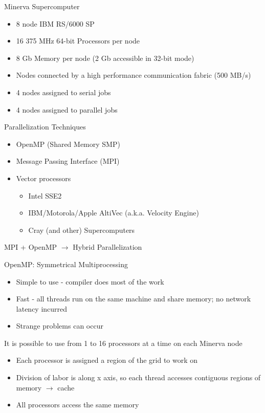 \documentclass[pdf, nototal, slideBW]{prosper}
\newcommand{\insgraphic}[2]{
  \begin{center}
    \scalebox{#1}{
      \texttt{[image: \#2]}
    }
  \end{center}
}
\begin{document}
\begin{slide}{Minerva Supercomputer}
  \insgraphic{0.5}{minerva-sp.eps}
  
  \begin{itemize}
  \item 8 node IBM RS/6000 SP 
  \item 16 375 MHz 64-bit Processors per node
  \item 8 Gb Memory per node (2 Gb accessible in 32-bit mode)
  \item Nodes connected by a high performance communication fabric (500 MB/s)
  \item 4 nodes assigned to serial jobs
  \item 4 nodes assigned to parallel jobs
  \end{itemize}
\end{slide}

\begin{slide}{Parallelization Techniques}
  \begin{itemize}
  \item OpenMP (Shared Memory SMP)
  \item Message Passing Interface (MPI)
  \item Vector processors
    \begin{itemize}
    \item Intel SSE2
    \item IBM/Motorola/Apple AltiVec (a.k.a. Velocity Engine)
    \item Cray (and other) Supercomputers
    \end{itemize}
  \end{itemize}

  MPI + OpenMP $\rightarrow$ Hybrid Parallelization
\end{slide}

\begin{slide}{OpenMP: Symmetrical Multiprocessing}
  \begin{itemize}
  \item Simple to use - compiler does most of the work
  \item Fast - all threads run on the same machine and share memory;
    no network latency incurred
  \item Strange problems can occur
  \end{itemize}
  \vspace{0.5cm}

  It is possible to use from 1 to 16 processors at a time on each
  Minerva node
  \begin{itemize}
  \item Each processor is assigned a region of the grid to work on
  \item Division of labor is along x axis, so each thread accesses
  contiguous regions of memory $\rightarrow$ cache 
  \item All processors access the same memory 
  \end{itemize}

\end{slide}
\end{document}
